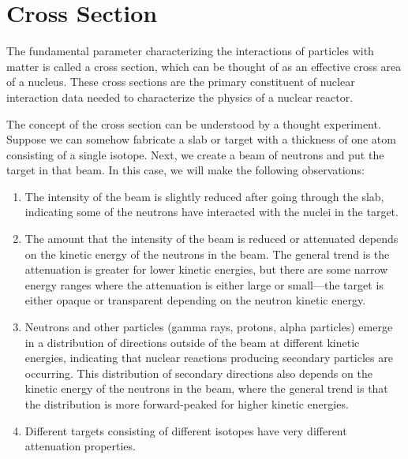 \section{Cross Section}

The fundamental parameter characterizing the interactions of particles with matter is called a cross section, which can be thought of as an effective cross area of a nucleus. These cross sections are the primary constituent of nuclear interaction data needed to characterize the physics of a nuclear reactor.

The concept of the cross section can be understood by a thought experiment. Suppose we can somehow fabricate a slab or target with a thickness of one atom consisting of a single isotope. Next, we create a beam of neutrons and put the target in that beam. In this case, we will make the following observations:
\begin{enumerate}
  \item The intensity of the beam is slightly reduced after going through the slab, indicating some of the neutrons have interacted with the nuclei in the target.
  \item The amount that the intensity of the beam is reduced or attenuated depends on the kinetic energy of the neutrons in the beam. The general trend is the attenuation is greater for lower kinetic energies, but there are some narrow energy ranges where the attenuation is either large or small---the target is either opaque or transparent depending on the neutron kinetic energy.
  \item Neutrons and other particles (gamma rays, protons, alpha particles) emerge in a distribution of directions outside of the beam at different kinetic energies, indicating that nuclear reactions producing secondary particles are occurring. This distribution of secondary directions also depends on the kinetic energy of the neutrons in the beam, where the general trend is that the distribution is more forward-peaked for higher kinetic energies.
  \item Different targets consisting of different isotopes have very different attenuation properties.
\end{enumerate} 

